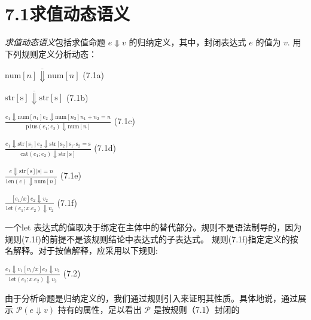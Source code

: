 \section{7.1求值动态语义}%

{\it 求值动态语义}包括求值命题 $e\Downarrow v$ 的归纳定义，其中，封闭表达式 $e$ 的值为 $v$. 用下列规则定义分析动态：%
\begin{center}%
$\overline{\mathrm{n}\mathrm{u}\mathrm{m}[n]\Downarrow \mathrm{n}\mathrm{u}\mathrm{m}[n]}$   (7.1a)

$\overline{\mathrm{s}\mathrm{t}\mathrm{r}[\mathrm{s}]\Downarrow \mathrm{s}\mathrm{t}\mathrm{r}[\mathrm{s}]}$   (7.1b)

$\displaystyle \frac{e_{1}\Downarrow \mathrm{n}\mathrm{u}\mathrm{m}[n_{1}]e_{2}\Downarrow \mathrm{n}\mathrm{u}\mathrm{m}[n_{2}]n_{1}+n_{2}=n}{\mathrm{p}1\mathrm{u}\mathrm{s}(e_{1};e_{2})\Downarrow \mathrm{n}\mathrm{u}\mathrm{m}[n]}$   (7.1c)

$\displaystyle \frac{e_{1}\Downarrow \mathrm{s}\mathrm{t}\mathrm{r}[\mathrm{s}_{1}]e_{2}\Downarrow \mathrm{s}\mathrm{t}\mathrm{r}[\mathrm{s}_{2}]\mathrm{s}_{1^{\wedge}}\mathrm{s}_{2}=\mathrm{s}}{\mathrm{c}\mathrm{a}\mathrm{t}(e_{1};e_{2})\Downarrow \mathrm{s}\mathrm{t}\mathrm{r}[\mathrm{s}]}$   (7.1d)

$\displaystyle \frac{e\Downarrow \mathrm{s}\mathrm{t}\mathrm{r}[\mathrm{s}]|\mathrm{s}|=n}{1\mathrm{e}\mathrm{n}(e)\Downarrow \mathrm{n}\mathrm{u}\mathrm{m}[n]}$   (7.1e)

$\displaystyle \frac{[e_{1}/x]e_{2}\Downarrow v_{2}}{1\mathrm{e}\mathrm{t}(e_{1};x.e_{2})\Downarrow v_{2}}$   (7.1f)
\end{center}
一个let 表达式的值取决于绑定在主体中的替代部分。规则不是语法制导的，因为规则(7.1f)的前提不是该规则结论中表达式的子表达式。
规则(7.1f)指定定义的按名解释。对于按值解释，应采用以下规则:

\begin{center}
$\displaystyle \frac{e_{1}\Downarrow v_{1}[v_{1}/x]e_{2}\Downarrow v_{2}}{1\mathrm{e}\mathrm{t}(e_{1};x.e_{2})\Downarrow v_{2}}$   (7.2)
\end{center}
由于分析命题是归纳定义的，我们通过规则引入来证明其性质。具体地说，通过展示 $\mathcal{P}(e\Downarrow v)$ 持有的属性，足以看出 $\mathcal{P}$ 是按规则（7.1）封闭的

